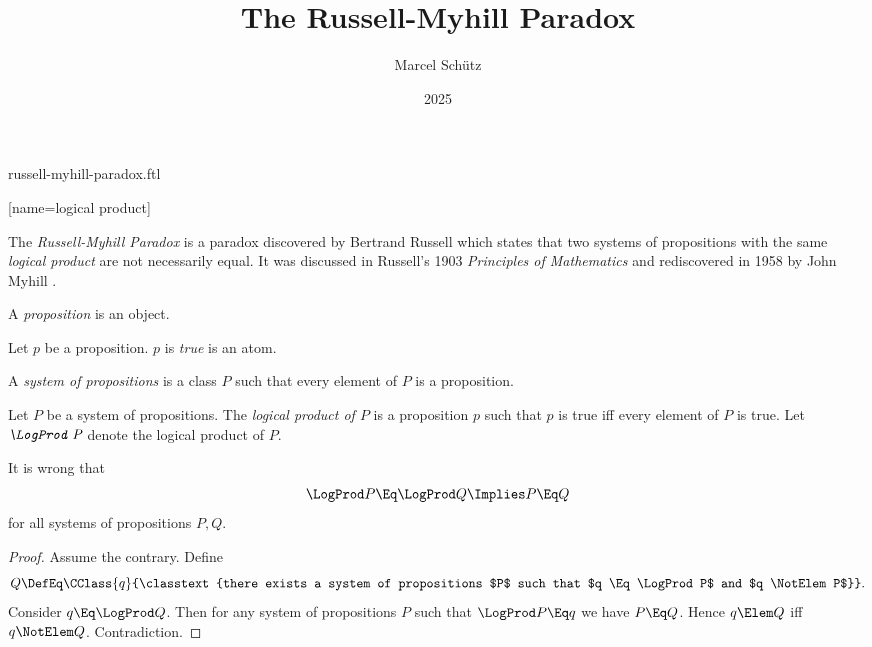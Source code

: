 \documentclass{stex}
\title{The Russell-Myhill Paradox}
\author{Marcel Schütz}
\date{2025}
\begin{document}
\begin{smodule}{russell-myhill-paradox.ftl}


[name=logical product]{\sqcap\,}


\maketitle

\noindent The \emph{Russell-Myhill Paradox} is a paradox discovered by 
Bertrand Russell which states that two systems of propositions with the same 
\emph{logical product} are not necessarily equal.
It was discussed in Russell's 1903 \emph{Principles of Mathematics}
\cite[Appendix B]{Russell1903} and rediscovered in 1958 by John Myhill
\cite{Myhill1958}.

\begin{forthel}
  \begin{signature*}[for=proposition]
    A \emph{proposition} is an object.
  \end{signature*}

  \begin{signature*}[for=true]
    Let $p$ be a proposition.
    $p$ is \emph{true} is an atom.
  \end{signature*}

  \begin{definition*}[for=system of propositions]
    A \emph{system of propositions} is a class $P$ such that every element of $P$ is a proposition.
  \end{definition*}

  \begin{signature*}[for=logical product]
    Let $P$ be a system of propositions.
    The \emph{logical product of $P$} is a proposition $p$ such that $p$ is true iff every element of $P$ is true.
    Let $\emph{\LogProd P}$ denote the logical product of $P$.
  \end{signature*}
  
  \begin{theorem*}[title=Russell-Myhill Paradox,name=Russell-Myhill Paradox]
    It is wrong that
    \[ \LogProd P \Eq \LogProd Q \Implies P \Eq Q \]
    for all systems of propositions $P, Q$.
  \end{theorem*}
  \begin{proof}
    Assume the contrary.
    Define
    \[ Q \DefEq \CClass{q}{\classtext{there exists a system of propositions $P$ such
    that $q \Eq \LogProd P$  and $q \NotElem P$}}. \]
    Consider $q \Eq \LogProd Q$.
    Then for any system of propositions $P$ such that $\LogProd P \Eq q$ we have $P \Eq Q$.
    Hence $q \Elem Q$ iff $q \NotElem Q$.
    Contradiction.
  \end{proof}
\end{forthel}

\printbibliography
{}

\end{smodule}
\end{document}
